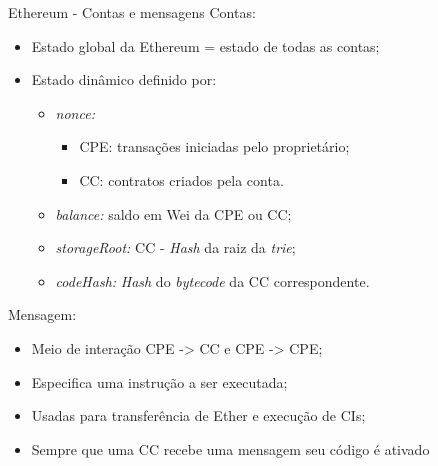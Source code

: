 \begin{frame}{Ethereum - Contas e mensagens}
Contas:
    \begin{itemize}
        \item Estado global da Ethereum = estado de todas as contas;
        \item Estado dinâmico definido por:
        \begin{itemize}
            \item \textit{nonce:}
            \begin{itemize}
                \item CPE: transações iniciadas pelo proprietário;
                \item CC: contratos criados pela conta.
            \end{itemize}
            \item \textit{balance:} saldo em Wei da CPE ou CC;
            \item \textit{storageRoot:} CC - \textit{Hash} da raiz da \textit{trie};
            \item \textit{codeHash:} \textit{Hash} do \textit{bytecode} da CC correspondente.
        \end{itemize}
    \end{itemize}
Mensagem: 
    \begin{itemize}
        \item Meio de interação CPE -> CC e CPE -> CPE;
        \item Especifica uma instrução a ser executada;
        \item Usadas para transferência de Ether e execução de CIs;
        \item Sempre que uma CC recebe uma mensagem seu código é ativado
    \end{itemize}    
\end{frame}

